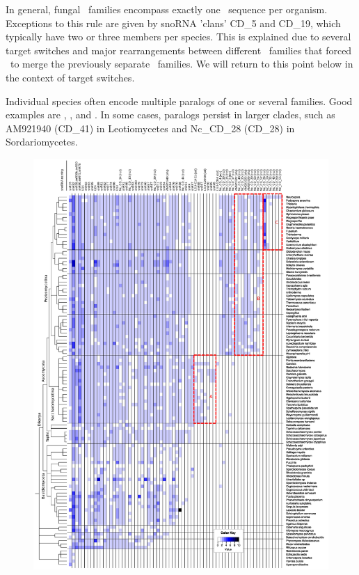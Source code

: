 In general, fungal \sno\ families encompass exactly one \sno\ sequence
per organism. Exceptions to this rule are given by snoRNA 'clans'
CD\_5 and CD\_19, which typically have two or three members per
species.  This is explained due to several target switches and major
rearrangements between different \sno\ families that forced
\snostrip\ to merge the previously separate \sno\ families. We will
return to this point below in the context of target switches.

Individual species often encode multiple paralogs of one or several
families. Good examples are \Ppl, \Asp, and \Nfu. In some cases,
paralogs persist in larger clades, such as AM921940 (CD\_41) in
Leotiomycetes and Nc\_CD\_28 (CD\_28) in Sordariomycetes.

\begin{figure}
  \vspace{-1cm}
  \centering
  \includegraphics[width=1.05\textwidth]{pics/CD_snoRNAs_collapsed.short_naming.rotated.eps}

\end{figure}
